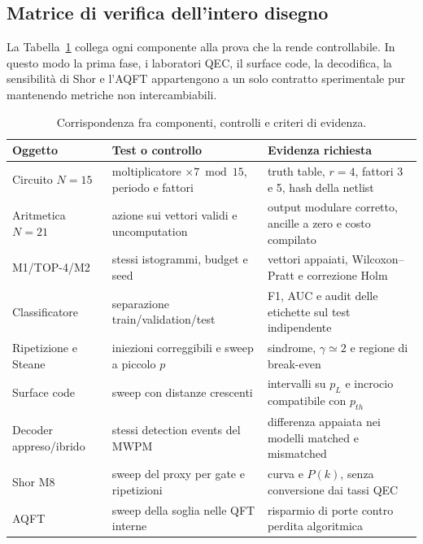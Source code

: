 \begin{onehalfspace}
\section{Matrice di verifica dell'intero disegno}

La Tabella~\ref{tab:verifica_requisiti} collega ogni componente alla prova che
la rende controllabile. In questo modo la prima fase, i laboratori QEC, il
surface code, la decodifica, la sensibilità di Shor e l'\ac{AQFT} appartengono
a un solo contratto sperimentale pur mantenendo metriche non intercambiabili.

\begin{table}[!htbp]
\centering
\small
\begin{tabularx}{\textwidth}{@{}p{}XX@{}}
\toprule
\textbf{Oggetto} & \textbf{Test o controllo} & \textbf{Evidenza richiesta} \\
\midrule
Circuito $N=15$ & moltiplicatore $\times7\bmod15$, periodo e fattori & truth table, $r=4$, fattori 3 e 5, hash della netlist \\
Aritmetica $N=21$ & azione sui vettori validi e uncomputation & output modulare corretto, ancille a zero e costo compilato \\
M1/TOP-4/M2 & stessi istogrammi, budget e seed & vettori appaiati, Wilcoxon--Pratt e correzione Holm \\
Classificatore & separazione train/validation/test & F1, AUC e audit delle etichette sul test indipendente \\
Ripetizione e Steane & iniezioni correggibili e sweep a piccolo $p$ & sindrome, $\gamma\simeq2$ e regione di break-even \\
Surface code & sweep con distanze crescenti & intervalli su $p_L$ e incrocio compatibile con $p_{th}$ \\
Decoder appreso/ibrido & stessi detection events del \ac{MWPM} & differenza appaiata nei modelli matched e mismatched \\
Shor M8 & sweep del proxy per gate e ripetizioni & curva e $P(k)$, senza conversione dai tassi QEC \\
\ac{AQFT} & sweep della soglia nelle QFT interne & risparmio di porte contro perdita algoritmica \\
\bottomrule
\end{tabularx}
\caption{Corrispondenza fra componenti, controlli e criteri di evidenza.}
\label{tab:verifica_requisiti}
\end{table}

\end{onehalfspace}
